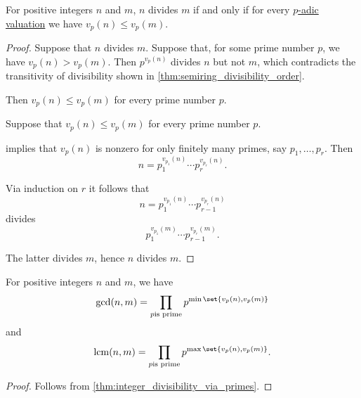 \begin{corollary}\label{thm:integer_divisibility_via_primes}
  For positive integers \( n \) and \( m \), \( n \) divides \( m \) if and only if for every \hyperref[def:padic_valuation]{\( p \)-adic valuation} we have \( v_p(n) \leq v_p(m) \).
\end{corollary}
\begin{proof}
  \SufficiencySubProof Suppose that \( n \) divides \( m \). Suppose that, for some prime number \( p \), we have \( v_p(n) > v_p(m) \). Then \( p^{v_p(n)} \) divides \( n \) but not \( m \), which contradicts the transitivity of divisibility shown in \cref{thm:semiring_divisibility_order}.

  Then \( v_p(n) \leq v_p(m) \) for every prime number \( p \).

  \NecessitySubProof Suppose that \( v_p(n) \leq v_p(m) \) for every prime number \( p \).

   implies that \( v_p(n) \) is nonzero for only finitely many primes, say \( p_1, \ldots, p_r \). Then
  \begin{equation}\label{eq:thm:integer_divisibility_via_primes/proof/decomposition}
    n = p_1^{v_{p_1}(n)} \cdots p_r^{v_{p_r}(n)}.
  \end{equation}

  Via induction on \( r \) it follows that
  \begin{equation*}
    n = p_1^{v_{p_1}(n)} \cdots p_{r-1}^{v_{p_r}(n)}
  \end{equation*}
  divides
  \begin{equation*}
    p_1^{v_{p_1}(m)} \cdots p_{r-1}^{v_{p_r}(m)}.
  \end{equation*}

  The latter divides \( m \), hence \( n \) divides \( m \).
\end{proof}

\begin{corollary}\label{thm:integer_gcd_lcm_via_primes}
  For positive integers \( n \) and \( m \), we have
  \begin{equation*}
    \gcd(n, m) = \prod_{p \T{is prime}} p^{\min\set{ v_p(n), v_p(m) }}
  \end{equation*}
  and
  \begin{equation*}
    \lcm(n, m) = \prod_{p \T{is prime}} p^{\max\set{ v_p(n), v_p(m) }}.
  \end{equation*}
\end{corollary}
\begin{proof}
  Follows from \cref{thm:integer_divisibility_via_primes}.
\end{proof}

